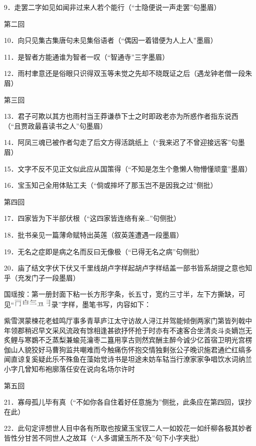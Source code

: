 9．走罢二字如见如闻非过来人若个能行{（\kaishu “士隐便说一声走罢”句墨眉）}

第二回

10．向只见集古集唐句未见集俗语者{（\kaishu “偶因一着错便为人上人”墨眉）}

11．是智者方能通谁为智者一叹{（\kaishu “智通寺”三字墨眉）}

12．雨村聿意还是俗眼只识得双玉等未觉之先却不晓既证之后{（\kaishu 遇龙钟老僧一段朱眉）}

第三回

13．君子可欺以其方也雨村当王莽谦恭下士之时即政老亦为所惑作者指东说西{（\kaishu “且贾政最喜读书之人”句墨眉）}

14．阿凤三魂已被作者勾走了后文方得活跳纸上{（\kaishu “我来迟了不曾迎接远客”句墨眉）}

15．文字不反不见正文似此应从国策得{（\kaishu “不知是怎生个惫懒人物懵懂顽童”墨眉）}

16．宝玉知己全用体贴工夫{（\kaishu “倘或摔坏了那玉岂不是因我之过”侧批）}

第四回

17．四家皆为下半部伏根{（\kaishu “这四家皆连络有亲\ldots{}”句侧批）}

18．批书亲见一篇薄命赋特出英莲{（\kaishu 叙英莲遭遇一段墨眉）}

19．无名之症即是病之名而反曰无像极{（\kaishu “已得无名之病”句侧批）}

20．庙了结文字伏下伏又千里线胡卢字样起胡卢字样结盖一部书皆系胡提之意也知乎{（\kaishu 充发门子一段墨眉）}

国瑶按：第一册封面下粘一长方形字条，长五寸，宽约三寸半，左下方撕缺，可见“\includegraphics[width=20mm]{../images/00032}录”字样，墨笔书写，内容如下：

紫雪溟蒙楝花老蛙鸣厅事多青草庐江太守访故人浔江并驾能倾倒两家门第皆列戟中年领郡稍迟早文采风流政有馀相逢甚欲抒怀抢于时亦有不速客合坐清炎斗炎嫡岂无炙鲤与寒鷃不乏蒸梨兼蝓芫瀹枣二簋用享古则然宾酬主醉今诚少亿首宿卫明光宫楞伽山人貌狡好马曹狗监共嘲难而今触痛伤怀抱交情独剩张公子晚识施君通纻红缟多闻直谅复奚疑此乐不殊鱼在藻始觉诗书是坦途未妨车轱当行潦家家争唱饮水词纳兰小字几曾知布袍廓落任安在说向名场尔许时

第五回

21．寡母孤儿毕有真{（\kaishu “不如你各自住着好任意施为”侧批，此条应在第四回，误抄在此）}

22．此句定评想世人目中各有所取也按黛玉宝钗二人一如姣花一如纤柳各极其妙者皆性分甘苦不同世人之故耳{（\kaishu “人多谓黛玉所不及”句下小字夹批）}

